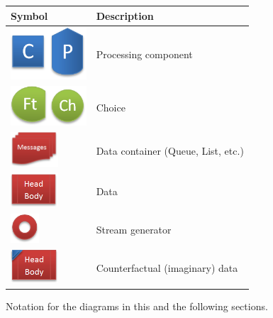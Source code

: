 \begin{figure}
	\begin{center}
		\begin{tabular}{l l}
			\toprule
			Symbol & Description\\
			\midrule
			
			\begin{minipage}[t]{0.2\textwidth}
				\includegraphics[width=80pt]{Figs/legend_proc.png}
			\end{minipage}
			& Processing component\\
			\includegraphics[width=80pt]{Figs/legend_choice.png} & Choice\\
			\includegraphics[width=50pt]{Figs/legend_container.png} & Data container (Queue, List, etc.)\\
			\includegraphics[width=50pt]{Figs/legend_data.png} & Data\\
			\includegraphics[width=30pt]{Figs/legend_generator.png} & Stream generator\\
			\includegraphics[width=50pt]{Figs/legend_imaginary.png} & Counterfactual (imaginary) data\\
			\bottomrule
		\end{tabular}
	\end{center}
	\caption{Notation for the diagrams in this and the following sections.}
	\label{fig:diagramNotation}
\end{figure}
